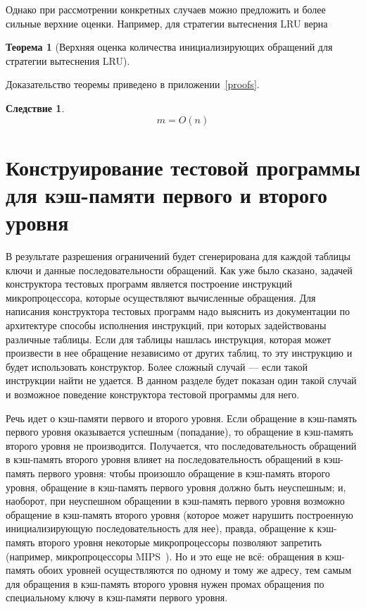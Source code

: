 \documentclass[14pt]{extreport}
\newtheorem{theorem}{Теорема}
\newtheorem*{sld}{Следствие}
\newcommand{\LRU}{\textsf{LRU}\xspace}
\begin{document}
Однако при рассмотрении конкретных случаев можно предложить и более сильные верхние оценки. Например, для стратегии вытеснения \LRU верна

\begin{theorem}[Верхняя оценка количества инициализирующих обращений для стратегии вытеснения
\LRU]\label{thm_mirror_lenth_lru} \UpperBoundLRUMirror
\end{theorem}
Доказательство теоремы приведено в приложении~\ref{proofs}.
\begin{sld}
      $$m = O(n)$$
\end{sld}


\section{Конструирование тестовой программы для кэш-памяти первого и второго уровня}

В результате разрешения ограничений будет сгенерирована для каждой таблицы ключи и данные последовательности обращений. Как уже было сказано, задачей конструктора тестовых программ является построение инструкций микропроцессора, которые осуществляют вычисленные обращения. Для написания конструктора тестовых программ надо выяснить из документации по архитектуре способы исполнения инструкций, при которых задействованы различные таблицы. Если для таблицы нашлась инструкция, которая может произвести в нее обращение независимо от других таблиц, то эту инструкцию и будет использовать конструктор. Более сложный случай --- если такой инструкции найти не удается. В данном разделе будет показан один такой случай и возможное поведение конструктора тестовой программы для него.

Речь идет о кэш-памяти первого и второго уровня. Если обращение в кэш-память первого уровня оказывается успешным (попадание), то обращение в кэш-память второго уровня не производится. Получается, что последовательность обращений в кэш-память второго уровня влияет на последовательность обращений в кэш-память первого уровня: чтобы произошло обращение в кэш-память второго уровня, обращение в кэш-память первого уровня должно быть неуспешным; и, наоборот, при неуспешном обращении в кэш-память первого уровня возможно обращение в кэш-память второго уровня (которое может нарушить построенную инициализирующую последовательность для нее), правда, обращение к кэш-память второго уровня некоторые микропроцессоры позволяют запретить (например, микропроцессоры MIPS~\cite{MIPS64_III}). Но и это еще не всё: обращения в кэш-память обоих уровней осуществляются по одному и тому же адресу, тем самым для обращения в кэш-память второго уровня нужен промах обращения по специальному ключу в кэш-памяти первого уровня.
\end{document}
